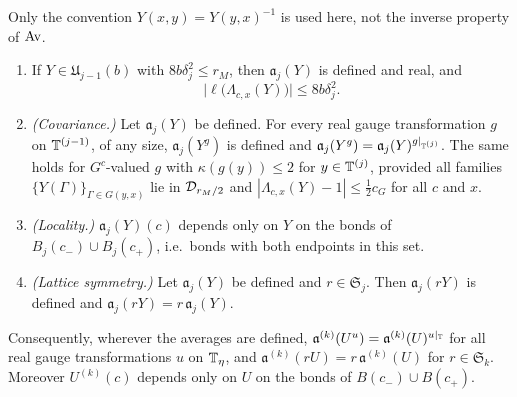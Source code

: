 Only the convention $Y(x,y)=Y(y,x)^{-1}$ is used here, not the inverse property of $\operatorname{Av}$.

\begin{lemma}\label{lem:one-step-basic}
\begin{enumerate}[label=(\alph*)]
\item If $Y\in\mathfrak U_{j-1}(b)$ with $8b\delta_j^2\le r_M$, then $\mathfrak a_j(Y)$ is defined and real, and
\[
\big|\ell\big(\Lambda_{c,x}(Y)\big)\big|\le8b\delta_j^2 .
\]
\item \emph{(Covariance.)} Let $\mathfrak a_j(Y)$ be defined. For every real gauge transformation $g$ on $\mathbb T^{(j-1)}$, of any size, $\mathfrak a_j(Y^g)$ is defined and $\mathfrak a_j(Y^g)=\mathfrak a_j(Y)^{g|_{\mathbb T^{(j)}}}$. The same holds for $G^c$-valued $g$ with $\kappa(g(y))\le2$ for $y\in\mathbb T^{(j)}$, provided all families $\{Y(\Gamma)\}_{\Gamma\in G(y,x)}$ lie in $\mathcal D_{r_M/2}$ and $|\Lambda_{c,x}(Y)-1|\le\frac12c_G$ for all $c$ and $x$.
\item \emph{(Locality.)} $\mathfrak a_j(Y)(c)$ depends only on $Y$ on the bonds of $B_j(c_-)\cup B_j(c_+)$, i.e.\ bonds with both endpoints in this set.
\item \emph{(Lattice symmetry.)} Let $\mathfrak a_j(Y)$ be defined and $r\in\mathfrak S_j$. Then $\mathfrak a_j(rY)$ is defined and $\mathfrak a_j(rY)=r\,\mathfrak a_j(Y)$.
\end{enumerate}
Consequently, wherever the averages are defined, $\mathfrak a^{(k)}(U^u)=\mathfrak a^{(k)}(U)^{u|_\mathbb T}$ for all real gauge transformations $u$ on $\mathbb T_\eta$, and $\mathfrak a^{(k)}(rU)=r\,\mathfrak a^{(k)}(U)$ for $r\in\mathfrak S_k$. Moreover $U^{(k)}(c)$ depends only on $U$ on the bonds of $B(c_-)\cup B(c_+)$.
\end{lemma}


